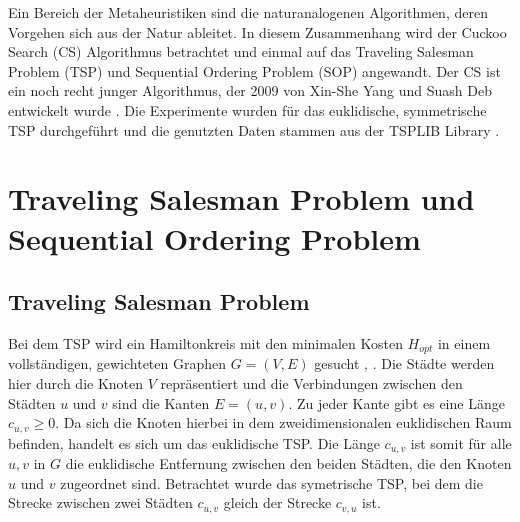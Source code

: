 \documentclass[conference]{IEEEtran}
\begin{document}
    Ein Bereich der Metaheuristiken sind die naturanalogenen Algorithmen, deren Vorgehen sich aus der Natur ableitet. In diesem Zusammenhang 
    wird der Cuckoo Search (CS) Algorithmus betrachtet und einmal auf das Traveling Salesman Problem (TSP) und Sequential Ordering Problem (SOP) 
    angewandt. Der CS ist ein noch recht junger Algorithmus, der 2009 von Xin-She Yang und Suash Deb entwickelt wurde \cite{b1}. 
    Die Experimente wurden für das euklidische, symmetrische TSP durchgeführt und die genutzten Daten stammen aus der TSPLIB Library \cite{b12}.

  \section{Traveling Salesman Problem und Sequential Ordering Problem}
    \subsection{Traveling Salesman Problem}
      Bei dem TSP wird ein Hamiltonkreis mit den minimalen Kosten $H_{opt}$ in einem vollständigen, 
      gewichteten Graphen $G = (V,E)$ gesucht \cite{b2}, \cite{b3}. Die Städte werden hier durch 
      die Knoten $V$ repräsentiert und die Verbindungen zwischen den Städten $u$ und $v$ sind die 
      Kanten $E = (u,v)$. Zu jeder Kante gibt es eine Länge $c_{u,v} \geq 0$. Da sich die Knoten hierbei 
      in dem zweidimensionalen euklidischen Raum befinden, handelt es sich um das euklidische TSP. 
      Die Länge $c_{u,v}$ ist somit für alle $u,v$ in $G$ die euklidische Entfernung zwischen den beiden Städten, 
      die den Knoten $u$ und $v$ zugeordnet sind. Betrachtet wurde das symetrische TSP, bei dem die Strecke 
      zwischen zwei Städten $c_{u,v}$ gleich der Strecke $c_{v,u}$ ist.
\end{document}
